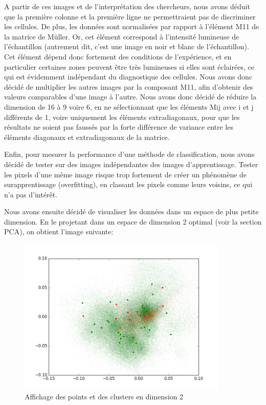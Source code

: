 \documentclass[a4paper,10pt]{report}
\begin{document}
A partir de ces images et de l'interprétation des chercheurs, nous avons déduit que la première colonne et la première ligne ne permettraient pas de discriminer les cellules. De plus, les données sont normalisées par rapport à l'élément M11 de la matrice de Müller. Or, cet élément correspond à l'intensité lumineuse de l'échantillon (autrement dit, c'est une image en noir et blanc de l'échantillon). Cet élément dépend donc fortement des conditions de l'expérience, et en particulier certaines zones peuvent être très lumineuses si elles sont éclairées, ce qui est évidemment indépendant du diagnostique des cellules. Nous avons donc décidé de multiplier les autres images par la composant M11, afin d'obtenir des valeurs comparables d'une image à l'autre. Nous avons donc décidé de réduire la dimension de 16 à 9 voire 6, en ne sélectionnant que les éléments Mij avec i et j différents de 1, voire uniquement les éléments extradiagonaux, pour que les résultats ne soient pas faussés par la forte différence de variance entre les éléments diagonaux et extradiagonaux de la matrice. 


Enfin, pour mesurer la performance d'une méthode de classification, nous avons décidé de tester sur des images indépendantes des images d'apprentissage. Tester les pixels d'une même image risque trop fortement de créer un phénomène de surapprentissage (overfitting), en classant les pixels comme leurs voisins, ce qui n'a pas d'intérêt.


Nous avons ensuite décidé de visualiser les données dans un espace de plus petite dimension. En le projetant dans un espace de dimension 2 optimal (voir la section PCA), on obtient l'image suivante:
\begin{figure}[htbp]
  \caption{Affichage des points et des clusters en dimension 2}
  \centering
  \includegraphics[width=10cm]{visualisation.png}
\end{figure}
\end{document}
